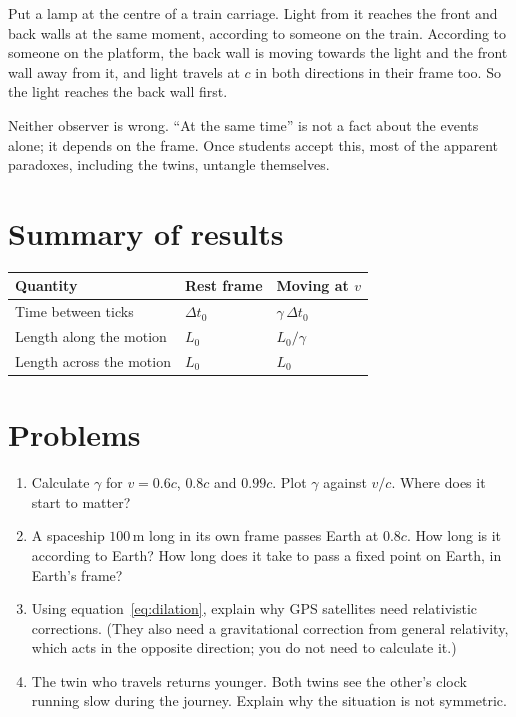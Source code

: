 Put a lamp at the centre of a train carriage. Light from it reaches the front and back walls at the same moment, according to someone on the train. According to someone on the platform, the back wall is moving towards the light and the front wall away from it, and light travels at $c$ in both directions in their frame too. So the light reaches the back wall first.

Neither observer is wrong. ``At the same time'' is not a fact about the events alone; it depends on the frame. Once students accept this, most of the apparent paradoxes, including the twins, untangle themselves.

\section{Summary of results}

\begin{center}
\begin{tabular}{|l|l|l|}
\hline
Quantity & Rest frame & Moving at $v$ \\
\hline
Time between ticks & $\Delta t_0$ & $\gamma\,\Delta t_0$ \\
Length along the motion & $L_0$ & $L_0/\gamma$ \\
Length across the motion & $L_0$ & $L_0$ \\
\hline
\end{tabular}
\end{center}

\section{Problems}

\begin{enumerate}
  \item Calculate $\gamma$ for $v = 0.6c$, $0.8c$ and $0.99c$. Plot $\gamma$ against $v/c$. Where does it start to matter?
  \item A spaceship $100\,\mathrm{m}$ long in its own frame passes Earth at $0.8c$. How long is it according to Earth? How long does it take to pass a fixed point on Earth, in Earth's frame?
  \item Using equation~\eqref{eq:dilation}, explain why GPS satellites need relativistic corrections. (They also need a gravitational correction from general relativity, which acts in the opposite direction; you do not need to calculate it.)
  \item The twin who travels returns younger. Both twins see the other's clock running slow during the journey. Explain why the situation is not symmetric.
\end{enumerate}
